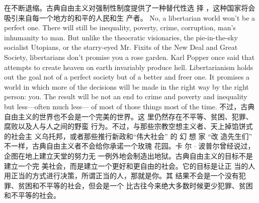 \begin{paracol}{2}
在不断退缩。古典自由主义对强制性制度提供了一种替代性选
择 ，这种国家将会吸引来自每一个地方的和平的人民和生
产者。
\switchcolumn*
No, a libertarian world won't be a perfect one. There will still
be inequality, poverty, crime, corruption, man's inhumanity to
man. But unlike the theocratic visionaries, the pie-in-the-sky
socialist Utopians, or the starry-eyed Mr. Fixits of the New Deal
and Great Society, libertarians don't promise you a rose garden.
Karl Popper once said that attempts to create heaven on earth
invariably produce hell. Libertarianism holds out the goal not of
a perfect society but of a better and freer one. It promises a
world in which more of the decisions will be made in the right
way by the right person: you. The result will be not an end to
crime and poverty and inequality but less---often much less---
of most of those things most of the time.
\switchcolumn
不过，古典自由主义的世界也不会是一个完美的世界。这
里仍然存在不平等、贫困、犯罪、腐败以及人与人之间的野蛮
行为。不过，与那些宗教空想主义者、天上掉馅饼式的社会主
义乌托邦，或者那些推行新政和“伟大社会” 的 幻 想 家 “改
造先生们” 不一样，古典自由主义者不会给你承诺一个玫瑰
花园。卡 尔 $\cdot$ 波普尔曾经说过，企图在地上建立天堂的努力无
一例外地会制造出地狱。古典自由主义的目标不是建立一个完
美社会，而是建立一个更好和更自由的社会。它的目标是让正
当的人用正当的方式进行决策，所谓正当的人，那就是你。其
结果不会是一个没有犯罪、贫困和不平等的社会，但会是一个
比古往今来绝大多数时候更少犯罪、贫困和不平等的社会。
\end{paracol}